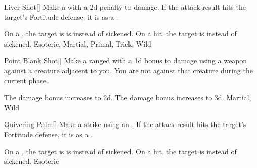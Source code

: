 \lowercase{\hypertarget{maneuver:Liver Shot}{}}\label{maneuver:Liver Shot}
\hypertarget{maneuver:Liver Shot}{}
\begin{freeability}[Rank 3]{Liver Shot}[]
Make a  with a \minus2d penalty to damage.
If the attack result hits the target's Fortitude defense,
it is  as a .

\rankline
{} On a , the target is is  instead of sickened.
 On a hit, the target is  instead of sickened.
 Esoteric, Martial, Primal, Trick, Wild
\end{freeability}
\vspace{0.25em}



\lowercase{\hypertarget{maneuver:Point Blank Shot}{}}\label{maneuver:Point Blank Shot}
\hypertarget{maneuver:Point Blank Shot}{}
\begin{freeability}[Rank 3]{Point Blank Shot}[]
Make a ranged  with a \plus1d bonus to damage using a  weapon against a creature adjacent to you.
You are not  against that creature during the current phase.

\rankline
{} The damage bonus increases to \plus2d.
 The damage bonus increases to \plus3d.
 Martial, Wild
\end{freeability}
\vspace{0.25em}



\lowercase{\hypertarget{maneuver:Quivering Palm}{}}\label{maneuver:Quivering Palm}
\hypertarget{maneuver:Quivering Palm}{}
\begin{freeability}[Rank 3]{Quivering Palm}[]
Make a strike using an .
If the attack result hits the target's Fortitude defense,
it is  as a .

\rankline
{} On a , the target is is  instead of sickened.
 On a hit, the target is  instead of sickened.
 Esoteric
\end{freeability}
\vspace{0.25em}



